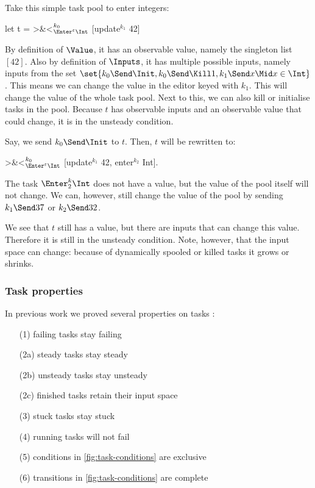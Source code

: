 \begin{example}
  \label{exm:integer-task-pool}
  Take this simple task pool to enter integers:
  \begin{TASK}
    let t = >&<$_{\Enter^\epsilon \Int}^{k_0}$ [update$^{k_1}$ 42]
  \end{TASK}

  By definition of $\Value$, it has an observable value, namely the singleton list $[42]$.
  Also by definition of $\Inputs$, it has multiple possible inputs,
  namely inputs from the set $\set{k_0\Send\Init, k_0\Send\Kill1, k_1\Send x \Mid x\in\Int}$.
  This means we can change the value in the editor keyed with $k_1$.
  This will change the value of the whole task pool.
  Next to this, we can also kill or initialise tasks in the pool.
  Because $t$ has observable inputs and an observable value that could change,
  it is in the unsteady condition.

  Say, we send $k_0\Send\Init$ to $t$.
  Then, $t$ will be rewritten to:
  \begin{TASK}
    >&<$_{\Enter^\epsilon \Int}^{k_0}$ [update$^{k_1}$ 42, enter$^{k_2}$ Int].
  \end{TASK}
  The task $\Enter^k_2\Int$ does not have a value,
  but the value of the pool itself will not change.
  We can, however, still change the value of the pool by sending $k_1\Send37$ or $k_2\Send32$.

  We see that $t$ still has a value,
  but there are inputs that can change this value.
  Therefore it is still in the unsteady condition.
  Note, however, that the input space can change:
  because of dynamically spooled or killed tasks it grows or shrinks.
\end{example}


\subsubsection{Task properties}

In previous work we proved several properties on tasks \cite{conf/sfp/KlijnsmaS22,Steenvoorden22}:
\begin{enumerate}
  \item[(1)] failing tasks stay failing
  \item[(2a)] steady tasks stay steady
  \item[(2b)] unsteady tasks stay unsteady
  \item[(2c)] finished tasks retain their input space
  \item[(3)] stuck tasks stay stuck
  \item[(4)] running tasks will not fail
  \item[(5)] conditions in \cref{fig:task-conditions} are exclusive
  \item[(6)] transitions in \cref{fig:task-conditions} are complete
\end{enumerate}

